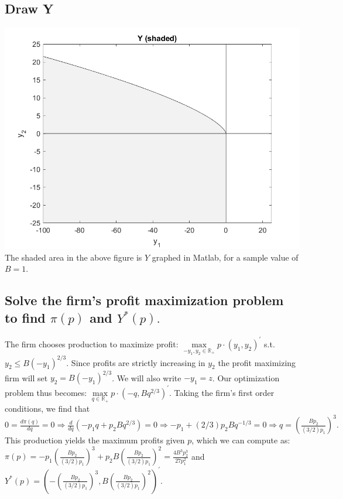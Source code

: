 \documentclass[11pt]{article} %
\begin{document}
\subsection{Draw Y}
\includegraphics{Y}
The shaded area in the above figure is $Y$ graphed in Matlab, for a sample value of $B=1$.

\subsection{Solve the firm's profit maximization problem to find $\pi (p)$ and $Y^{*}(p).$}
The firm chooses production to maximize profit: $\max\limits_{-y_1,y_2 \in \mathbb{R}_{+}} p \cdot (y_1,y_2)^{'}$ s.t. $y_2 \leq B(-y_1)^{2/3}$. Since profits are strictly increasing in $y_2$ the profit maximizing firm will set $y_2 =  B(-y_1)^{2/3}$. We will also write $-y_1 = z$. Our optimization problem thus becomes: $\max\limits_{q\in\mathbb{R}_{+}} p \cdot (-q, Bq^{2/3})^{'}.$ Taking the firm's first order conditions, we find that $0 = \frac{d \pi(q)}{dq} = 0 \Rightarrow \frac{d }{dq}\left(  -p_1 q + p_2 Bq^{2/3}\right)  = 0 \Rightarrow -p_1 + (2/3)p_2 B q^{-1/3} = 0 \Rightarrow q = \left(\frac{Bp_2}{ (3/2) p_1} \right)^{3}.$ This production yields the maximum profits given $p$, which we can compute as:\\ $\pi(p) = -p_1\left(\frac{Bp_2}{ (3/2) p_1} \right)^{3} + p_2 B\left(\frac{Bp_2}{ (3/2) p_1} \right)^{2} = \frac{4B^3p_{2}^{3}}{27p_{1}^{2}}$ and $Y^{*}(p) = \left(-\left(\frac{Bp_2}{ (3/2) p_1} \right)^{3},B\left(\frac{Bp_2}{ (3/2) p_1} \right)^{2}\right)^{'}$.
\end{document}
